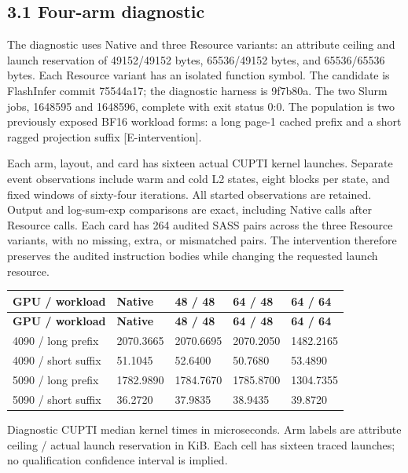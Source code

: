 \documentclass[11pt,a4paper]{article}
\begin{document}
\subsection*{3.1 Four-arm diagnostic}

The diagnostic uses Native and three Resource variants: an attribute ceiling and launch reservation of 49152/\allowbreak{}49152 bytes, 65536/\allowbreak{}49152 bytes, and 65536/\allowbreak{}65536 bytes. Each Resource variant has an isolated function symbol. The candidate is FlashInfer commit 75544a17; the diagnostic harness is 9f7b80a. The two Slurm jobs, 1648595 and 1648596, complete with exit status 0:0. The population is two previously exposed BF16 workload forms: a long page-1 cached prefix and a short ragged projection suffix [E-intervention].


Each arm, layout, and card has sixteen actual CUPTI kernel launches. Separate event observations include warm and cold L2 states, eight blocks per state, and fixed windows of sixty-four iterations. All started observations are retained. Output and log-sum-exp comparisons are exact, including Native calls after Resource calls. Each card has 264 audited SASS pairs across the three Resource variants, with no missing, extra, or mismatched pairs. The intervention therefore preserves the audited instruction bodies while changing the requested launch resource.


\begin{small}
\begin{longtable}{@{}p{4.6cm}p{2.3cm}p{2.3cm}p{2.3cm}p{2.3cm}@{}}
\toprule
\textbf{GPU /\allowbreak{} workload} & \textbf{Native} & \textbf{48 /\allowbreak{} 48} & \textbf{64 /\allowbreak{} 48} & \textbf{64 /\allowbreak{} 64} \\
\midrule\endfirsthead
\toprule
\textbf{GPU /\allowbreak{} workload} & \textbf{Native} & \textbf{48 /\allowbreak{} 48} & \textbf{64 /\allowbreak{} 48} & \textbf{64 /\allowbreak{} 64} \\
\midrule\endhead
4090 /\allowbreak{} long prefix & 2070.3665 & 2070.6695 & 2070.2050 & 1482.2165 \\
4090 /\allowbreak{} short suffix & 51.1045 & 52.6400 & 50.7680 & 53.4890 \\
5090 /\allowbreak{} long prefix & 1782.9890 & 1784.7670 & 1785.8700 & 1304.7355 \\
5090 /\allowbreak{} short suffix & 36.2720 & 37.9835 & 38.9435 & 39.8720 \\
\bottomrule
\end{longtable}
\end{small}
\noindent\small Diagnostic CUPTI median kernel times in microseconds. Arm labels are attribute ceiling /\allowbreak{} actual launch reservation in KiB. Each cell has sixteen traced launches; no qualification confidence interval is implied.\normalsize\par\medskip
\end{document}
